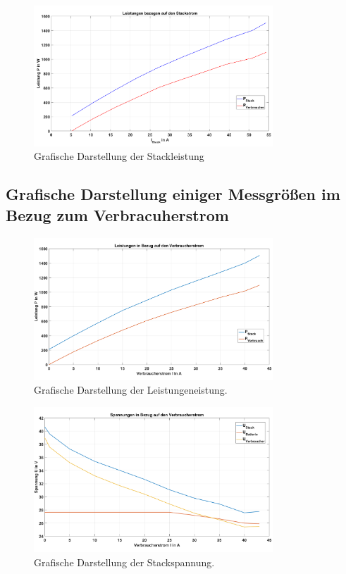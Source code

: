 \begin{figure}[H]
  \centering
  \includegraphics[width=0.8\textwidth]{Abbildungen/Aufgabe62_P.png}
  \caption{Grafische Darstellung der Stackleistung}
  \label{fig:230626_Stackleistung}
\end{figure}


\subsection{Grafische Darstellung einiger Messgrößen im Bezug zum Verbracuherstrom}

\begin{figure}[H]
    \centering
    \includegraphics[width=0.8\textwidth]{Abbildungen/Aufgabe63_Leistungen_P.png}
    \caption{Grafische Darstellung der Leistungeneistung.}
    \label{fig:230626_Leistungen}
\end{figure}

\begin{figure}[H]
  \centering
  \includegraphics[width=0.8\textwidth]{Abbildungen/Aufgabe63_Leistungen_U.png}
  \caption{Grafische Darstellung der Stackspannung.}
  \label{fig:230626_Spannungen}
\end{figure}

